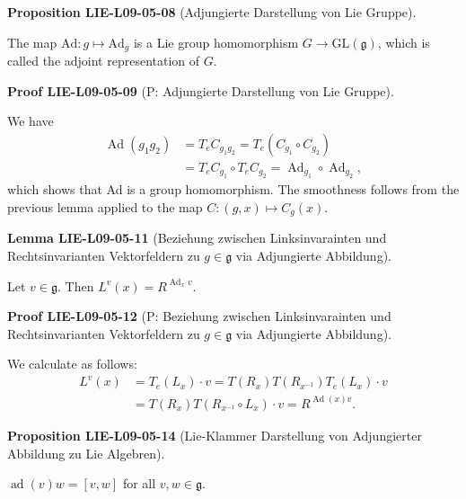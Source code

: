 \documentclass[10pt, letterpaper]{article}
\newcommand{\CustomHeading}[3]{%
  \par\medskip\noindent%
  \textbf{#1 #2} \textnormal{(#3)}.\enskip%
}
\newenvironment{PROP}[2]{\CustomHeading{Proposition}{#1}{#2}}{}
\newenvironment{LEM}[2]{\CustomHeading{Lemma}{#1}{#2}}{}
\newenvironment{PROOF}[2]{\CustomHeading{Proof}{#1}{#2}}{}
\begin{document}
\begin{PROP}{LIE-L09-05-08}{Adjungierte Darstellung von Lie Gruppe}
The map $\mathrm{Ad}: g \mapsto \mathrm{Ad}_{g}$ is a Lie group homomorphism $G \rightarrow \mathrm{GL}(\mathfrak{g})$, which is called the adjoint representation of $G$.
\end{PROP}

\begin{PROOF}{LIE-L09-05-09}{P: Adjungierte Darstellung von Lie Gruppe}
We have
$$
\begin{aligned}
\operatorname{Ad}\left(g_{1} g_{2}\right) & =T_{e} C_{g_{1} g_{2}}=T_{e}\left(C_{g_{1}} \circ C_{g_{2}}\right) \\
& =T_{e} C_{g_{1}} \circ T_{e} C_{g_{2}}=\operatorname{Ad}_{g_{1}} \circ \operatorname{Ad}_{g_{2}},
\end{aligned}
$$
which shows that Ad is a group homomorphism. The smoothness follows from the previous lemma applied to the map $C:(g, x) \mapsto C_{g}(x)$.
\end{PROOF}

\begin{LEM}{LIE-L09-05-11}{Beziehung zwischen Linksinvarainten und Rechtsinvarianten Vektorfeldern zu $g\in\mathfrak{g}$ via Adjungierte Abbildung}
Let $v \in \mathfrak{g}$. Then $L^{v}(x)=R^{\operatorname{Ad}_{x} v}$.
\end{LEM}

\begin{PROOF}{LIE-L09-05-12}{P: Beziehung zwischen Linksinvarainten und Rechtsinvarianten Vektorfeldern zu $g\in\mathfrak{g}$ via Adjungierte Abbildung}
We calculate as follows:
$$
\begin{aligned}
L^{v}(x) & =T_{e}\left(L_{x}\right) \cdot v=T\left(R_{x}\right) T\left(R_{x^{-1}}\right) T_{e}\left(L_{x}\right) \cdot v \\
& =T\left(R_{x}\right) T\left(R_{x^{-1}} \circ L_{x}\right) \cdot v=R^{\operatorname{Ad}(x) v} .
\end{aligned}
$$
\end{PROOF}

\begin{PROP}{LIE-L09-05-14}{Lie-Klammer Darstellung von Adjungierter Abbildung zu Lie Algebren}
$\operatorname{ad}(v) w=[v, w]$ for all $v, w \in \mathfrak{g}$.
\end{PROP}
\end{document}
